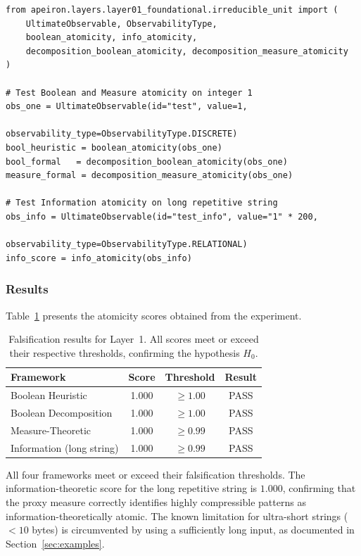 \begin{verbatim}
from apeiron.layers.layer01_foundational.irreducible_unit import (
    UltimateObservable, ObservabilityType,
    boolean_atomicity, info_atomicity,
    decomposition_boolean_atomicity, decomposition_measure_atomicity
)

# Test Boolean and Measure atomicity on integer 1
obs_one = UltimateObservable(id="test", value=1,
                              observability_type=ObservabilityType.DISCRETE)
bool_heuristic = boolean_atomicity(obs_one)
bool_formal   = decomposition_boolean_atomicity(obs_one)
measure_formal = decomposition_measure_atomicity(obs_one)

# Test Information atomicity on long repetitive string
obs_info = UltimateObservable(id="test_info", value="1" * 200,
                               observability_type=ObservabilityType.RELATIONAL)
info_score = info_atomicity(obs_info)
\end{verbatim}

\subsubsection{Results}
Table~\ref{tab:results_h1} presents the atomicity scores obtained from the experiment.

\begin{table}[htbp]
    \centering
    \begin{tabular}{l c c c}
        \toprule
        \textbf{Framework} & \textbf{Score} & \textbf{Threshold} & \textbf{Result} \\
        \midrule
        Boolean Heuristic      & 1.000 & $\ge 1.00$ & PASS \\
        Boolean Decomposition  & 1.000 & $\ge 1.00$ & PASS \\
        Measure-Theoretic      & 1.000 & $\ge 0.99$ & PASS \\
        Information (long string) & 1.000 & $\ge 0.99$ & PASS \\
        \bottomrule
    \end{tabular}
    \caption{Falsification results for Layer~1. All scores meet or exceed their respective thresholds, confirming the hypothesis $H_0$.}
    \label{tab:results_h1}
\end{table}

All four frameworks meet or exceed their falsification thresholds. The information-theoretic score for the long repetitive string is $1.000$, confirming that the proxy measure correctly identifies highly compressible patterns as information-theoretically atomic. The known limitation for ultra-short strings ($<10$ bytes) is circumvented by using a sufficiently long input, as documented in Section~\ref{sec:examples}.

